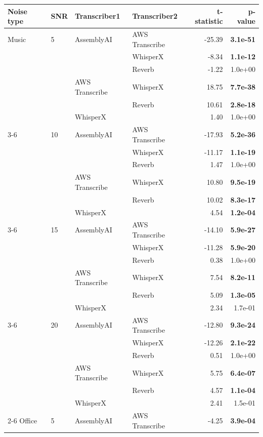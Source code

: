 \begin{tabular}{llllrr}
\toprule
Noise type & SNR & Transcriber1 & Transcriber2 & t-statistic & p-value \\
\midrule
Music & 5 & AssemblyAI & AWS Transcribe & -25.39 & \textbf{ 3.1e-51} \\
  &   &   & WhisperX & -8.34 & \textbf{ 1.1e-12} \\
  &   &   & Reverb & -1.22 &  1.0e+00 \\
  &   & AWS Transcribe & WhisperX & 18.75 & \textbf{ 7.7e-38} \\
  &   &   & Reverb & 10.61 & \textbf{ 2.8e-18} \\
  &   & WhisperX &   & 1.40 &  1.0e+00 \\
\cmidrule(r){3-6}
  & 10 & AssemblyAI & AWS Transcribe & -17.93 & \textbf{ 5.2e-36} \\
  &   &   & WhisperX & -11.17 & \textbf{ 1.1e-19} \\
  &   &   & Reverb & 1.47 &  1.0e+00 \\
  &   & AWS Transcribe & WhisperX & 10.80 & \textbf{ 9.5e-19} \\
  &   &   & Reverb & 10.02 & \textbf{ 8.3e-17} \\
  &   & WhisperX &   & 4.54 & \textbf{ 1.2e-04} \\
\cmidrule(r){3-6}
  & 15 & AssemblyAI & AWS Transcribe & -14.10 & \textbf{ 5.9e-27} \\
  &   &   & WhisperX & -11.28 & \textbf{ 5.9e-20} \\
  &   &   & Reverb & 0.38 &  1.0e+00 \\
  &   & AWS Transcribe & WhisperX & 7.54 & \textbf{ 8.2e-11} \\
  &   &   & Reverb & 5.09 & \textbf{ 1.3e-05} \\
  &   & WhisperX &   & 2.34 &  1.7e-01 \\
\cmidrule(r){3-6}
  & 20 & AssemblyAI & AWS Transcribe & -12.80 & \textbf{ 9.3e-24} \\
  &   &   & WhisperX & -12.26 & \textbf{ 2.1e-22} \\
  &   &   & Reverb & 0.51 &  1.0e+00 \\
  &   & AWS Transcribe & WhisperX & 5.75 & \textbf{ 6.4e-07} \\
  &   &   & Reverb & 4.57 & \textbf{ 1.1e-04} \\
  &   & WhisperX &   & 2.41 &  1.5e-01 \\
\cmidrule(r){2-6}
Office & 5 & AssemblyAI & AWS Transcribe & -4.25 & \textbf{ 3.9e-04} \\

\end{tabular}

